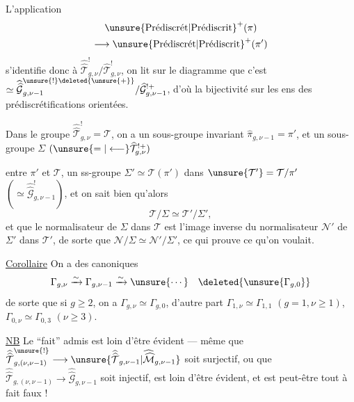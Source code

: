 L'application 
\begin{multline*}\unsure{\text{Prédiscrét}|\text{Prédiscrit}}^{+}(\pi)\\\longrightarrow
\unsure{\text{Prédiscrét}|\text{Prédiscrit}}^{+}(\pi')\end{multline*} s'identifie donc à
$\widehat{\widehat{\mathcal T}}_{g,\nu}^{!}/\widehat{\mathcal T}_{g,\nu}^{!}$,
on lit sur le diagramme que c'est
$\simeq\widehat{\widehat{\mathcal G}}_{g,\nu-1}^{\unsure{!}\deleted{\unsure{+}}}/
\widehat{\mathcal G}_{g,\nu-1}^{!+}$,
d'où la bijectivité sur les ens des prédiscrétifications orientées.

Dans le groupe $\widehat{\widehat{\mathcal T}}_{g,\nu}^{!}=\mathcal T$,
on a un sous-groupe invariant $\widehat{\pi}_{g,\nu-1}=\pi'$,
et un sous-groupe $\Sigma$ $(\unsure{=|\longleftarrow}\widehat{\mathcal T}_{g,\nu}^{!+})$


entre $\pi'$ et $\mathcal T$,   un ss-groupe $\Sigma'\simeq\mathcal T(\pi')$ dans $\unsure{\mathcal T'}=\mathcal T/\pi'$ $(\simeq\widehat{\widehat{\mathcal G}}^{!}_{g,\nu-1})$, et on sait bien qu'alors
\[
\mathcal T/\Sigma\simeq\mathcal T'/\Sigma',
\]
et  que le normalisateur  de $\Sigma$ dans $\mathcal T$ est l'image inverse du normalisateur $\mathcal N'$ de $\Sigma'$ dans $\mathcal T'$, de sorte que $\mathcal N/\Sigma\simeq\mathcal N'/\Sigma'$, ce qui prouve ce qu'on voulait.

\uline{Corollaire} On a des  canoniques
\[
\Gamma_{g,\nu}\xrightarrow{\sim}\Gamma_{g,\nu-1}\xrightarrow{\sim}\unsure{\cdots}\quad\deleted{\unsure{\Gamma_{g,0}}}
\]
de sorte que si $g\geq2$, on a  $\Gamma_{g,\nu}\simeq\Gamma_{g,0}$, d'autre part $\Gamma_{1,\nu}\simeq\Gamma_{1,1}$ $(g=1,\nu\geq1)$, $\Gamma_{0,\nu}\simeq\Gamma_{0,3}$ $(\nu\geq3)$.

\uline{NB} Le ``fait''  admis est loin d'être évident --- même que $\widehat{\widehat{\mathcal T}}^{\unsure{!}}_{g,(\nu,\nu-1)}\longrightarrow\unsure{\widehat{\widehat{\mathcal T}}_{g,\nu-1}|\widehat{\widehat{\mathcal M}}_{g,\nu-1}}$ soit surjectif, ou que $\widehat{\widehat{\mathcal T}}_{g,(\nu,\nu-1)}\longrightarrow\widehat{\widehat{\mathcal G}}_{g,\nu-1}$ soit injectif, est loin d'être évident, et est peut-être tout à fait faux !

